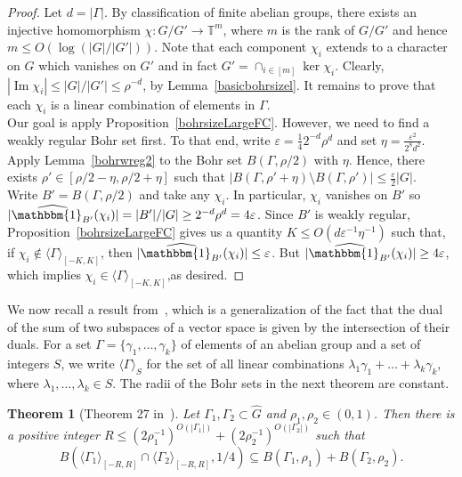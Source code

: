 \documentclass[a4paper,11pt]{article}
\newtheorem{theorem}{Theorem}
\numberwithin{theorem}{section}
\theoremstyle{definition}
\newcommand\id{\mathbbm{1}}
\newcommand{\on}[1]{
	\operatorname{#1}
}
\begin{document}
\begin{proof}
    Let $d = |\Gamma|$. By classification of finite abelian groups, there exists an injective homomorphism $\chi : G/ G' \to \mathbb{T}^m$, where $m$ is the rank of $G/G'$ and hence $m \leq O(\log (|G|/ |G'|)).$ Note that each component $\chi_i$ extends to a character on $G$ which vanishes on $G'$ and in fact $G' = \cap_{i \in [m]} \ker \chi_i$. Clearly, $|\on{Im} \chi_i| \leq |G|/|G'| \leq \rho^{-d}$, by Lemma~\ref{basicbohrsizel}. It remains to prove that each $\chi_i$ is a linear combination of elements in $\Gamma$.\\

    Our goal is apply Proposition~\ref{bohrsizeLargeFC}. However, we need to find a weakly regular Bohr set first. To that end, write $\varepsilon = \frac{1}{4} 2^{-d}\rho^{d}$ and set $\eta = \frac{\varepsilon^2}{2^8d^2}$. Apply Lemma~\ref{bohrwreg2} to the Bohr set $B(\Gamma, \rho/2)$ with $\eta$. Hence, there exists $\rho' \in [\rho/2 - \eta, \rho/2 + \eta]$ such that $|B(\Gamma, \rho' + \eta) \setminus B(\Gamma, \rho')| \leq \frac{\varepsilon}{2} |G|$.\\
    \indent Write $B' = B(\Gamma, \rho/2)$ and take any $\chi_i$. In particular, $\chi_i$ vanishes on $B'$ so $|\widehat{\id_{B'}}(\chi_i)| = |B'| / |G| \geq 2^{-d}\rho^{d} = 4\varepsilon$. Since $B'$ is weakly regular, Proposition~\ref{bohrsizeLargeFC} gives us a quantity $K \leq O(d \varepsilon^{-1} \eta^{-1})$ such that, if $\chi_i \notin \langle \Gamma\rangle_{[-K, K]}$, then $|\widehat{\id_{B'}}(\chi_i)| \leq \varepsilon$. But $|\widehat{\id_{B'}}(\chi_i)|  \geq 4 \varepsilon$, which implies $\chi_i \in \langle \Gamma\rangle_{[-K, K]}$,as desired.
\end{proof}


We now recall a result from~\cite{generalBilBog}, which is a generalization of the fact that the dual of the sum of two subspaces of a vector space is given by the intersection of their duals. For a set $\Gamma = \{\gamma_1, \dots, \gamma_k\}$ of elements of an abelian group and a set of integers $S$, we write $\langle \Gamma \rangle_S$ for the set of all linear combinations $\lambda_1\gamma_1 + \dots + \lambda_k \gamma_k$, where $\lambda_1, \dots, \lambda_k \in S$. The radii of the Bohr sets in the next theorem are constant.

\begin{theorem}[Theorem 27 in~\cite{generalBilBog}]\label{bohrSum}Let $\Gamma_1, \Gamma_2 \subset \hat{G}$ and $\rho_1, \rho_2 \in (0,1)$. Then there is a positive integer $R \leq (2\rho_1^{-1})^{O(|\Gamma_1|)} + (2\rho_2^{-1})^{O(|\Gamma_2|)}$ such that
\[B(\langle \Gamma_1 \rangle_{[-R, R]} \cap \langle \Gamma_2 \rangle_{[-R, R]}, 1/4) \subseteq B(\Gamma_1, \rho_1) + B(\Gamma_2, \rho_2).\]
\end{theorem}
\vspace{\baselineskip}
\end{document}
